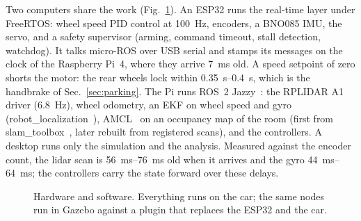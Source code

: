 \documentclass[conference]{IEEEtran}
\begin{document}
Two computers share the work (Fig.~\ref{fig:arch}). An ESP32 runs the real-time layer under FreeRTOS: wheel speed
PID control at \SI{100}{Hz}, encoders, a BNO085 IMU, the servo, and a safety supervisor (arming, command timeout,
stall detection, watchdog). It talks micro-ROS over USB serial and stamps its messages on the clock of the
Raspberry Pi~4, where they arrive \SI{7}{ms} old. A speed setpoint of zero shorts the motor: the rear wheels lock
within \SIrange{0.35}{0.4}{s}, which is the handbrake of Sec.~\ref{sec:parking}. The Pi runs ROS~2
Jazzy~\cite{ros2}: the RPLIDAR A1 driver (\SI{6.8}{Hz}), wheel odometry, an EKF on wheel speed and gyro
(robot\_localization~\cite{moore2014}), AMCL~\cite{fox1999} on an occupancy map of the room (first from
slam\_toolbox~\cite{macenski2021}, later rebuilt from registered scans), and the controllers. A desktop runs only the simulation and the analysis. Measured against the encoder count, the lidar
scan is \SIrange{56}{76}{ms} old when it arrives and the gyro \SIrange{44}{64}{ms}; the controllers carry the
state forward over these delays.

\begin{figure}[t]
\centering
{}
\caption{Hardware and software. Everything runs on the car; the same nodes run in Gazebo against a plugin that
replaces the ESP32 and the car.}
\label{fig:arch}
\end{figure}
\end{document}
